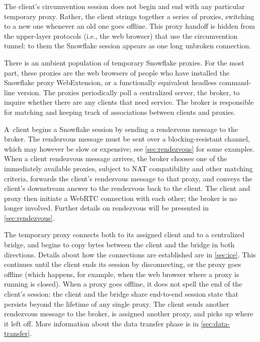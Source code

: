 \documentclass[letterpaper,twocolumn]{article}
\begin{document}
The client's circumvention session
does not begin and end with any particular temporary proxy.
Rather, the client strings together
a series of proxies, switching to a new one
whenever an old one goes offline.
This proxy handoff is hidden from the upper-layer protocols
(i.e., the web browser) that use the circumvention tunnel:
to them the Snowflake session appears as one long unbroken connection.

There is an ambient population of temporary Snowflake proxies.
For the most part, these proxies are the web browsers of people who have
installed the Snowflake proxy WebExtension,
or a functionally equivalent headless command-line version.
The proxies periodically poll a centralized server, the broker,
to inquire whether there are any clients that need service.
The broker is responsible for matching and
keeping track of associations between clients and proxies.

A~client begins a Snowflake session by
sending a rendezvous message to the broker.
The rendezvous message must be sent over a blocking-resistant channel,
which may however be slow or expensive; see \autoref{sec:rendezvous} for some examples.
When a client rendezvous message arrives,
the broker chooses one of the immediately available proxies,
subject to NAT compatibility and other matching criteria,
forwards the client's rendezvous message to that proxy,
and conveys the client's downstream answer to the rendezvous back to the client.
The client and proxy then initiate a WebRTC connection
with each other; the broker is no longer involved.
Further details on rendezvous will be presented in \autoref{sec:rendezvous}.

The temporary proxy connects both to its assigned client
and to a centralized bridge,
and begins to copy bytes between the client and the bridge
in both directions.
Details about how the connections are established are in \autoref{sec:ice}.
This continues until the client ends its session by disconnecting,
or the proxy goes offline
(which happens, for example, when the web browser where a proxy is running is closed).
When a proxy goes offline,
it does not spell the end of the client's session:
the client and the bridge share end-to-end session state
that persists beyond the lifetime of any single proxy.
The client sends another rendezvous message to the broker,
is assigned another proxy,
and picks up where it left off.
More information about the data transfer phase is in \autoref{sec:data-transfer}.
\end{document}
